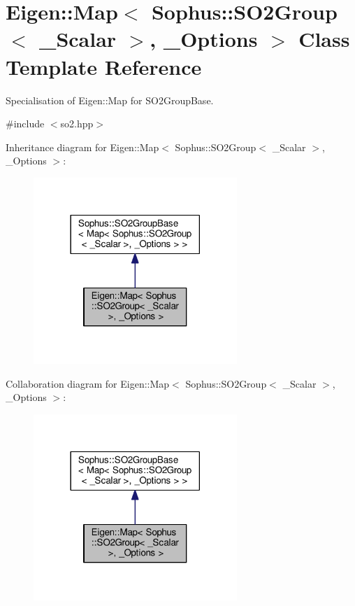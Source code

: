\hypertarget{class_eigen_1_1_map_3_01_sophus_1_1_s_o2_group_3_01___scalar_01_4_00_01___options_01_4}{}\section{Eigen\+:\+:Map$<$ Sophus\+:\+:S\+O2\+Group$<$ \+\_\+\+Scalar $>$, \+\_\+\+Options $>$ Class Template Reference}
\label{class_eigen_1_1_map_3_01_sophus_1_1_s_o2_group_3_01___scalar_01_4_00_01___options_01_4}


Specialisation of Eigen\+::\+Map for S\+O2\+Group\+Base.  




{\ttfamily \#include $<$so2.\+hpp$>$}



Inheritance diagram for Eigen\+:\+:Map$<$ Sophus\+:\+:S\+O2\+Group$<$ \+\_\+\+Scalar $>$, \+\_\+\+Options $>$\+:
\nopagebreak
\begin{figure}[H]
\begin{center}
\leavevmode
\includegraphics[width=218pt]{class_eigen_1_1_map_3_01_sophus_1_1_s_o2_group_3_01___scalar_01_4_00_01___options_01_4__inherit__graph}
\end{center}
\end{figure}


Collaboration diagram for Eigen\+:\+:Map$<$ Sophus\+:\+:S\+O2\+Group$<$ \+\_\+\+Scalar $>$, \+\_\+\+Options $>$\+:
\nopagebreak
\begin{figure}[H]
\begin{center}
\leavevmode
\includegraphics[width=218pt]{class_eigen_1_1_map_3_01_sophus_1_1_s_o2_group_3_01___scalar_01_4_00_01___options_01_4__coll__graph}
\end{center}
\end{figure}
